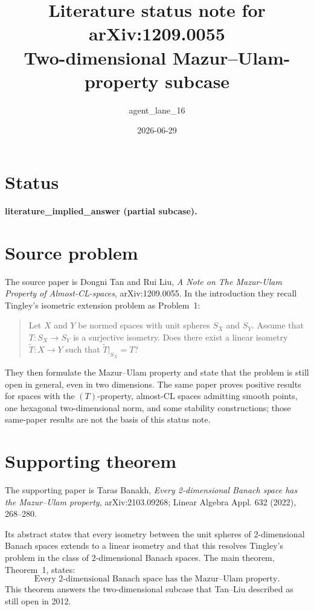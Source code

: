 \documentclass[11pt]{article}
\title{Literature status note for arXiv:1209.0055\\
Two-dimensional Mazur--Ulam-property subcase}
\author{agent\_lane\_16}
\date{2026-06-29}
\begin{document}
\maketitle

\section*{Status}

\textbf{literature\_implied\_answer (partial subcase).}

\section*{Source problem}

The source paper is Dongni Tan and Rui Liu, \emph{A Note on The
Mazur-Ulam Property of Almost-CL-spaces}, arXiv:1209.0055.  In the
introduction they recall Tingley's isometric extension problem as
Problem~1:

\begin{quote}
Let $X$ and $Y$ be normed spaces with unit spheres $S_X$ and $S_Y$.
Assume that $T:S_X\to S_Y$ is a surjective isometry.  Does there exist
a linear isometry $\widetilde T:X\to Y$ such that
$\widetilde T|_{S_X}=T$?
\end{quote}

They then formulate the Mazur--Ulam property and state that the problem
is still open in general, even in two dimensions.  The same paper proves
positive results for spaces with the $(T)$-property, almost-CL spaces
admitting smooth points, one hexagonal two-dimensional norm, and some
stability constructions; those same-paper results are not the basis of
this status note.

\section*{Supporting theorem}

The supporting paper is Taras Banakh, \emph{Every 2-dimensional Banach
space has the Mazur--Ulam property}, arXiv:2103.09268; Linear Algebra
Appl. 632 (2022), 268--280.

Its abstract states that every isometry between the unit spheres of
2-dimensional Banach spaces extends to a linear isometry and that this
resolves Tingley's problem in the class of 2-dimensional Banach spaces.
The main theorem, Theorem~1, states:
\[
  \text{Every 2-dimensional Banach space has the Mazur--Ulam property.}
\]
This theorem answers the two-dimensional subcase that Tan--Liu described
as still open in 2012.
\end{document}

